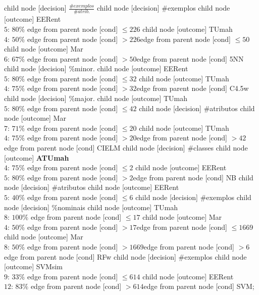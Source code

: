 child {node [decision] {$\frac{\#exemplos}{\#atrib.}$}
child {node [decision] {\#exemplos}
child {node [outcome] {EERent \\$5$: $80\%$} edge from parent node [cond] {$\leq226$}}
child {node [outcome] {TUmah \\$4$: $50\%$} edge from parent node [cond] {$>226$}}edge from parent node [cond] {$\leq50$}}
child {node [outcome] {Mar \\$6$: $67\%$} edge from parent node [cond] {$>50$}}edge from parent node [cond] {5NN}}
child {node [decision] {\%minor.}
child {node [outcome] {EERent \\$5$: $80\%$} edge from parent node [cond] {$\leq32$}}
child {node [outcome] {TUmah \\$4$: $75\%$} edge from parent node [cond] {$>32$}}edge from parent node [cond] {C4.5w}}
child {node [decision] {\%major.}
child {node [outcome] {TUmah \\$5$: $80\%$} edge from parent node [cond] {$\leq42$}}
child {node [decision] {\#atributos}
child {node [outcome] {Mar \\$7$: $71\%$} edge from parent node [cond] {$\leq20$}}
child {node [outcome] {TUmah \\$4$: $75\%$} edge from parent node [cond] {$>20$}}edge from parent node [cond] {$>42$}}edge from parent node [cond] {CIELM}}
child {node [decision] {\#classes}
child {node [outcome] {\textbf{ATUmah} \\$4$: $75\%$} edge from parent node [cond] {$\leq2$}}
child {node [outcome] {EERent \\$5$: $80\%$} edge from parent node [cond] {$>2$}}edge from parent node [cond] {NB}}
child {node [decision] {\#atributos}
child {node [outcome] {EERent \\$5$: $40\%$} edge from parent node [cond] {$\leq6$}}
child {node [decision] {\#exemplos}
child {node [decision] {\%nominais}
child {node [outcome] {TUmah \\$8$: $100\%$} edge from parent node [cond] {$\leq17$}}
child {node [outcome] {Mar \\$4$: $50\%$} edge from parent node [cond] {$>17$}}edge from parent node [cond] {$\leq1669$}}
child {node [outcome] {Mar \\$8$: $50\%$} edge from parent node [cond] {$>1669$}}edge from parent node [cond] {$>6$}}edge from parent node [cond] {RFw}}
child {node [decision] {\#exemplos}
child {node [outcome] {SVMsim \\$9$: $33\%$} edge from parent node [cond] {$\leq614$}}
child {node [outcome] {EERent \\$12$: $83\%$} edge from parent node [cond] {$>614$}}edge from parent node [cond] {SVM}};